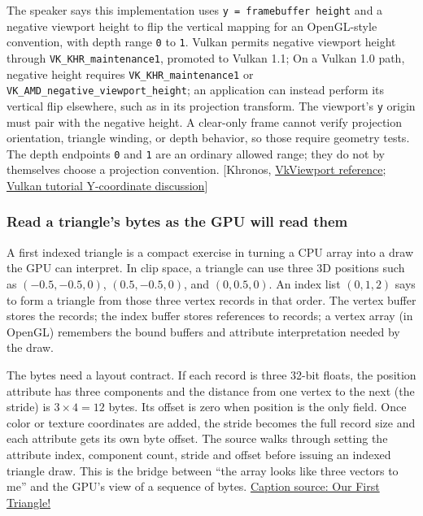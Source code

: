 The speaker says this implementation uses \texttt{y\ =\ framebuffer\ height} and a negative viewport height to flip the vertical mapping for an OpenGL-style convention, with depth range \texttt{0} to \texttt{1}. Vulkan permits negative viewport height through \texttt{VK\_KHR\_maintenance1}, promoted to Vulkan 1.1; On a Vulkan 1.0 path, negative height requires \texttt{VK\_KHR\_maintenance1} or \texttt{VK\_AMD\_negative\_viewport\_height}; an application can instead perform its vertical flip elsewhere, such as in its projection transform. The viewport's \texttt{y} origin must pair with the negative height. A clear-only frame cannot verify projection orientation, triangle winding, or depth behavior, so those require geometry tests. The depth endpoints \texttt{0} and \texttt{1} are an ordinary allowed range; they do not by themselves choose a projection convention. {[}Khronos, \href{https://docs.vulkan.org/refpages/latest/refpages/source/VkViewport.html}{VkViewport reference}; \href{https://docs.vulkan.org/tutorial/latest/05_Uniform_buffers/00_Descriptor_set_layout_and_buffer.html}{Vulkan tutorial Y-coordinate discussion}{]}

\subsubsection{Read a triangle's bytes as the GPU will read them}\label{read-a-triangles-bytes-as-the-gpu-will-read-them}

A first indexed triangle is a compact exercise in turning a CPU array into a draw the GPU can interpret. In clip space, a triangle can use three 3D positions such as \((-0.5,-0.5,0)\), \((0.5,-0.5,0)\), and \((0,0.5,0)\). An index list \((0,1,2)\) says to form a triangle from those three vertex records in that order. The vertex buffer stores the records; the index buffer stores references to records; a vertex array (in OpenGL) remembers the bound buffers and attribute interpretation needed by the draw.

The bytes need a layout contract. If each record is three 32-bit floats, the position attribute has three components and the distance from one vertex to the next (the stride) is \(3\times4=12\) bytes. Its offset is zero when position is the only field. Once color or texture coordinates are added, the stride becomes the full record size and each attribute gets its own byte offset. The source walks through setting the attribute index, component count, stride and offset before issuing an indexed triangle draw. This is the bridge between ``the array looks like three vectors to me'' and the GPU's view of a sequence of bytes. \href{https://www.youtube.com/watch?v=bwFYXo0VgCc}{Caption source: Our First Triangle!}

